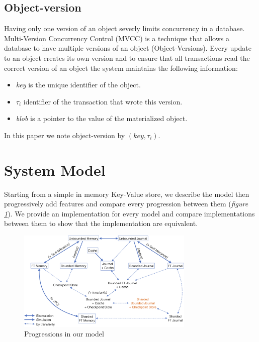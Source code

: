 \documentclass[systeme]{compas2022}
\begin{document}
\subsection{Object-version}

Having only one version of an object severly limits concurrency in a database.
Multi-Version Concurrency Control (MVCC) is a technique that allows a database to have multiple versions of an object (Object-Versions).
Every update to an object creates its own version and to ensure that all transactions read the correct version of an object the system maintains the following information: 
\begin{itemize}
  \item \emph{key} is the unique identifier of the object.
  \item \emph{$\tau_i$} identifier of the transaction that wrote this version.
  \item \emph{blob} is a pointer to the value of the materialized object.
\end{itemize}

In this paper we note object-version by $(key ,\tau_i)$.

\section{System Model}

Starting from a simple in memory Key-Value store, we describe the model then progressively add features and compare every progression between them (\emph{figure \ref{fig:transitions}}).
We provide an implementation for every model and compare implementations between them to show that the implementation are equivalent.

\begin{figure}[tp]
  \centering
  \includegraphics[width=0.75\textwidth]{figures/transitions.png}
  \caption{Progressions in our model}
  \label{fig:transitions}
\end{figure}
\end{document}
